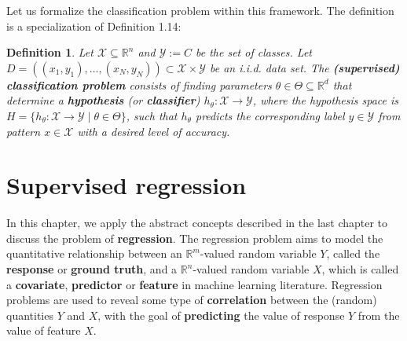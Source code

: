 \documentclass{report}
\newtheorem{definition}{Definition}[chapter]
\begin{document}
Let us formalize the classification problem within this framework. The definition is a specialization of Definition 1.14:

\begin{definition}
Let $\mathcal{X} \subseteq \mathbb{R}^n$ and $\mathcal{Y} := C$ be the set of classes. Let $D = ((x_1,y_1), \dots, (x_N,y_N)) \subset \mathcal{X} \times \mathcal{Y}$ be an i.i.d. data set. The \textbf{(supervised) classification problem} consists of finding parameters $\theta \in \Theta \subseteq \mathbb{R}^d$ that determine a \textbf{hypothesis} (or \textbf{classifier}) $h_\theta : \mathcal{X} \to \mathcal{Y}$, where the hypothesis space is $H = \{ h_\theta : \mathcal{X} \to \mathcal{Y} \mid \theta \in \Theta \}$, such that $h_\theta$ predicts the corresponding label $y \in \mathcal{Y}$ from pattern $x \in \mathcal{X}$ with a desired level of accuracy.
\end{definition}



\chapter{Supervised regression}
In this chapter, we apply the abstract concepts described in the last chapter to discuss the problem of \textbf{regression}. The regression problem aims to model the quantitative relationship between an $\mathbb{R}^m$-valued random variable $Y$, called the \textbf{response} or \textbf{ground truth}, and a $\mathbb{R}^n$-valued random variable $X$, which is called a \textbf{covariate}, \textbf{predictor} or \textbf{feature} in machine learning literature. Regression problems are used to reveal some type of \textbf{correlation} between the (random) quantities $Y$ and $X$, with the goal of \textbf{predicting} the value of response $Y$ from the value of feature $X$.
\end{document}
